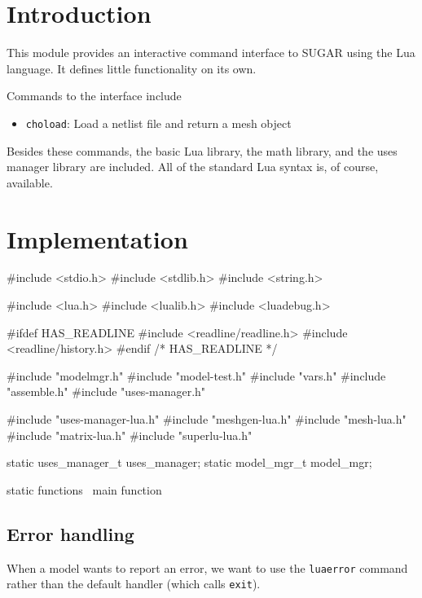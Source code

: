 
\section{Introduction}

This module provides an interactive command interface to SUGAR
using the Lua language.  It defines little functionality on its
own.

Commands to the interface include
\begin{itemize}
  \item {\tt{}cho{}load}: Load a netlist file and return a mesh object
\end{itemize}
Besides these commands, the basic Lua library, the math library,
and the uses manager library are included.
All of the standard Lua syntax is, of course, available.


\section{Implementation}

\endmoddef
#include <stdio.h>
#include <stdlib.h>
#include <string.h>

#include <lua.h>
#include <lualib.h>
#include <luadebug.h>

#ifdef HAS_READLINE
#include <readline/readline.h>
#include <readline/history.h>
#endif /* HAS_READLINE */

#include "modelmgr.h"
#include "model-test.h"
#include "vars.h"
#include "assemble.h"
#include "uses-manager.h"

#include "uses-manager-lua.h"
#include "meshgen-lua.h"
#include "mesh-lua.h"
#include "matrix-lua.h"
#include "superlu-lua.h"

static uses_manager_t uses_manager;
static model_mgr_t    model_mgr;

\LA{}static functions~{\nwtagstyle{}}\RA{}
\LA{}main function~{\nwtagstyle{}}\RA{}

\nwendcode{}\nwdocspar


\subsection{Error handling}

When a model wants to report an error, we want to use the
{\tt{}lua{}error} command rather than the default handler
(which calls {\tt{}exit}).

